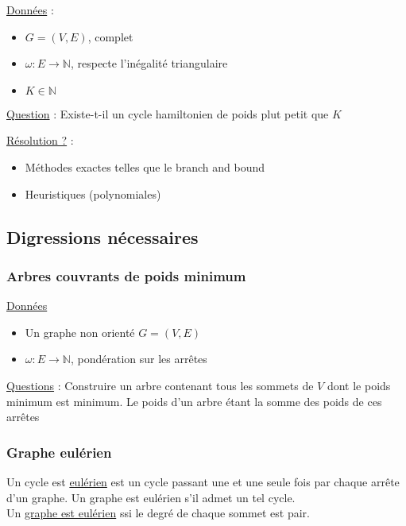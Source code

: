 \documentclass{article}
\theoremstyle{plain}
\begin{document}
        \underline{Données} :
          \begin{itemize}
            \item $G=(V, E)$, complet
            \item $\omega : E \to \mathbb{N}$, respecte l'inégalité triangulaire
            \item $K \in \mathbb{N}$
          \end{itemize}

        \underline{Question} :
            Existe-t-il un cycle hamiltonien de poids plut petit que $K$
        \vspace{5mm}

        \underline{Résolution ?} :
          \begin{itemize}
            \item Méthodes exactes telles que le branch and bound
            \item Heuristiques (polynomiales)
          \end{itemize}

    \subsection{Digressions nécessaires}


      \subsubsection{Arbres couvrants de poids minimum}

        \underline{Données}
        \begin{itemize}
          \item Un graphe non orienté $G = (V, E)$
          \item $\omega : E \to \mathbb{N}$, pondération sur les arrêtes
        \end{itemize}

        \underline{Questions} :
            Construire un arbre contenant tous les sommets de $V$ dont le poids
            minimum est minimum. Le poids d'un arbre étant la somme des poids de
            ces arrêtes

      \subsubsection{Graphe eulérien}

          Un cycle est \underline{eulérien} est un cycle passant une et une seule fois par
          chaque arrête d'un graphe. Un graphe est eulérien s'il admet un tel
          cycle.\\
          Un \underline{graphe est eulérien} ssi le degré de chaque sommet est pair.
\end{document}

